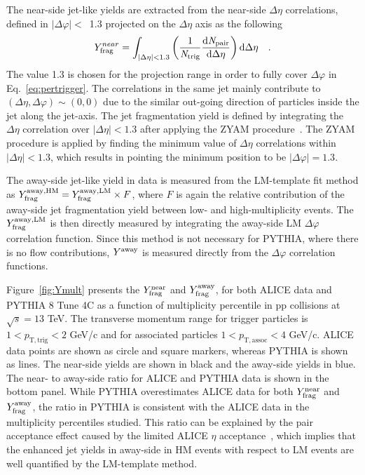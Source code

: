 The near-side jet-like yields are extracted from the near-side $\Delta\eta$ correlations, defined in $|\Delta\varphi|<$~1.3 projected on the $\Delta\eta$ axis as the following
\begin{eqnarray}
Y^{near}_{\rm{frag}} = \int_{|\Delta \eta|<1.3} \left( \frac{1}{\it{N}_{\rm{trig}}} \frac{ \rm{d}\it{}N_{\rm{pair}} }{ \rm{d}\Delta\eta } \right) \rm{d} \Delta\eta \quad.
\label{eq:Ynear}
\end{eqnarray}
The value 1.3 is chosen for the projection range in order to fully cover $\Delta\varphi$ in Eq.~\ref{eq:pertrigger}. The correlations in the same jet mainly contribute to $(\Delta\eta, \Delta\varphi) \sim (0,0)$ due to the similar out-going direction of particles inside the jet along the jet-axis. The jet fragmentation yield is defined by integrating the $\Delta\eta$ correlation over $|\Delta\eta|<1.3$ after applying the ZYAM procedure~\cite{Ajitanand:2005jj}. The ZYAM procedure is applied by finding the minimum value of $\Delta\eta$ correlations within $|\Delta\eta|<1.3$, which results in pointing the minimum position to be $|\Delta\varphi|=1.3$.

The away-side jet-like yield in data is measured from the LM-template fit method as $Y^{\rm{away, HM}}_{\mathrm{frag}} = Y^{\rm{away, LM}}_{\mathrm{frag}} \times F$, where $F$ is again the relative contribution of the away-side jet fragmentation yield between low- and high-multiplicity events. The $Y^{\rm{away, LM}}_{\mathrm{frag}}$ is then directly measured by integrating the away-side LM $\Delta\varphi$ correlation function. Since this method is not necessary for PYTHIA, where there is no flow contributions, $Y^{\rm{away}}$ is measured directly from the $\Delta\varphi$ correlation functions.

Figure~\ref{fig:Ymult} presents the $Y^{\mathrm{near}}_{\rm{frag}}$ and $Y^{\mathrm{away}}_{\rm{frag}}$, for both ALICE data and PYTHIA 8 Tune 4C as a function of multiplicity percentile in pp collisions at $\sqrt{s}=13$ TeV. The transverse momentum range for trigger particles is $1<p_\mathrm{T,trig}<2$ GeV/c and for associated particles $1<p_\mathrm{T,assoc}<4$ GeV/c. ALICE data points are shown as circle and square markers, whereas PYTHIA is shown as lines. The near-side yields are shown in black and the away-side yields in blue.
The near- to away-side ratio for ALICE and PYTHIA data is shown in the bottom panel. While PYTHIA overestimates ALICE data for both $Y^{\mathrm{near}}_{\rm{frag}}$ and $Y^{\mathrm{away}}_{\rm{frag}}$, the ratio in PYTHIA is consistent with the ALICE data in the multiplicity percentiles studied. This ratio can be explained by the pair acceptance effect caused by the limited ALICE $\eta$ acceptance~\cite{PHENIX:2006gto}, which implies that the enhanced jet yields in away-side in HM events with respect to LM events are well quantified by the LM-template method.

